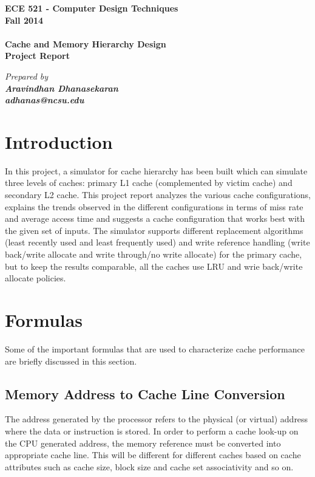 \documentclass[a4paper]{article}
\date{}                             %
\begin{document}
    \begin{titlepage}
        \vspace*{\fill}
        \begin{center}
            {\huge \bf ECE 521 - Computer Design Techniques \\ Fall 2014 \\ \vspace {8 mm} \\ \LARGE \bf Cache and Memory Hierarchy Design \\ \vspace{4 mm} Project Report}
            
            {\vspace{9 mm} \it \large Prepared by \\ \bf \Large Aravindhan Dhanasekaran\\ \bf \large adhanas@ncsu.edu}
        \end{center}
        \vspace*{\fill}
    \end{titlepage}


\newpage
\tableofcontents
\listoffigures
\listoftables
\newpage


\section{Introduction}
In this project, a simulator for cache hierarchy has been built which can simulate three levels of caches: primary L1 cache (complemented by victim cache) and secondary L2 cache. This project report analyzes the various cache configurations, explains the trends observed in the different configurations in terms of miss rate and average access time and suggests a cache configuration that works best with the given set of inputs. The simulator supports different replacement algorithms (least recently used and least frequently used) and write reference handling (write back/write allocate and write through/no write allocate) for the primary cache, but to keep the results comparable, all the caches use LRU and wrie back/write allocate policies.


\section{Formulas}
Some of the important formulas that are used to characterize cache performance are briefly discussed in this section.

\subsection{Memory Address to Cache Line Conversion}
The address generated by the processor refers to the physical (or virtual) address where the data or instruction is stored. In order to perform a cache look-up on the CPU generated address, the memory reference must be converted into appropriate cache line. This will be different for different caches based on cache attributes such as cache size, block size and cache set associativity and so on.
\end{document}
